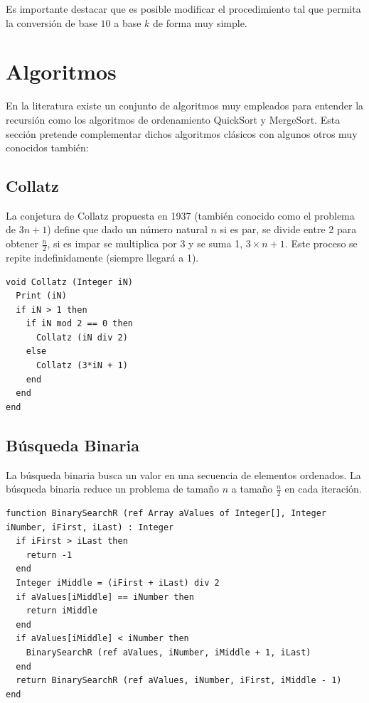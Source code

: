 Es importante destacar que es posible modificar el procedimiento tal que permita la conversión de base $10$ a base $k$ de forma muy simple.

\section{Algoritmos}

En la literatura existe un conjunto de algoritmos muy empleados para entender la recursión como los algoritmos de ordenamiento QuickSort y MergeSort. Esta sección pretende complementar dichos algoritmos clásicos con algunos otros muy conocidos también:

\subsection{Collatz}
La conjetura de Collatz propuesta en 1937 (también conocido como el problema de $3n + 1$) define que dado un número natural $n$ si es par, se divide entre 2 para obtener $\frac{n}{2}$, si es impar se multiplica por 3 y se suma 1, $3 \times n + 1$. Este proceso se repite indefinidamente (siempre llegará a 1).
\begin{lstlisting}[upquote=true, language=pseudo]
void Collatz (Integer iN)
  Print (iN)
  if iN > 1 then
    if iN mod 2 == 0 then 
      Collatz (iN div 2) 
    else 
      Collatz (3*iN + 1)
    end
  end
end
\end{lstlisting}


\subsection{Búsqueda Binaria}

La búsqueda binaria busca un valor en una secuencia de elementos ordenados. La búsqueda binaria reduce un problema de tamaño $n$ a tamaño $\frac{n}{2}$ en cada iteración.

\begin{lstlisting}[upquote=true, language=pseudo]
function BinarySearchR (ref Array aValues of Integer[], Integer iNumber, iFirst, iLast) : Integer
  if iFirst > iLast then
    return -1
  end
  Integer iMiddle = (iFirst + iLast) div 2
  if aValues[iMiddle] == iNumber then
    return iMiddle
  end
  if aValues[iMiddle] < iNumber then
    BinarySearchR (ref aValues, iNumber, iMiddle + 1, iLast)
  end
  return BinarySearchR (ref aValues, iNumber, iFirst, iMiddle - 1)
end
\end{lstlisting}

